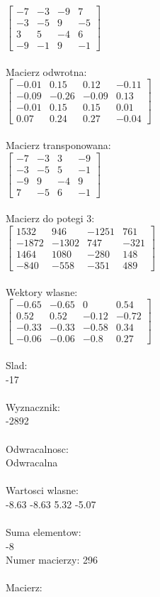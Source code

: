 \documentclass[a4paper,12pt]{article}
\begin{document}
$\begin{bmatrix} -7&-3&-9&7\\-3&-5&9&-5\\3&5&-4&6\\-9&-1&9&-1 \end{bmatrix}$
\\
\\
Macierz odwrotna:\\

$\begin{bmatrix} -0.01&0.15&0.12&-0.11\\-0.09&-0.26&-0.09&0.13\\-0.01&0.15&0.15&0.01\\0.07&0.24&0.27&-0.04 \end{bmatrix}$
\\
\\
Macierz transponowana:\\

$\begin{bmatrix} -7&-3&3&-9\\-3&-5&5&-1\\-9&9&-4&9\\7&-5&6&-1 \end{bmatrix}$
\\
\\
Macierz do potegi 3:\\

$\begin{bmatrix} 1532&946&-1251&761\\-1872&-1302&747&-321\\1464&1080&-280&148\\-840&-558&-351&489 \end{bmatrix}$
\\
\\
Wektory wlasne:\\

$\begin{bmatrix} -0.65&-0.65&0&0.54\\0.52&0.52&-0.12&-0.72\\-0.33&-0.33&-0.58&0.34\\-0.06&-0.06&-0.8&0.27 \end{bmatrix}$
\\
\\
Slad:\\
-17
\\
\\
Wyznacznik:\\
-2892
\\
\\
Odwracalnosc:\\
Odwracalna
\\
\\
Wartosci wlasne:\\
-8.63 -8.63 5.32 -5.07
\\
\\
Suma elementow:\\
-8
\\
\newpage
Numer macierzy:
296
\\
\\
Macierz:\\
\end{document}
